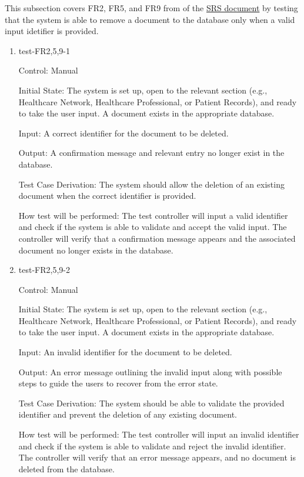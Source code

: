 \documentclass[12pt, titlepage]{article}
\begin{document}
This subsection covers FR2, FR5, and FR9 from of the \href{https://github.com/Inreet-Kaur/capstone/blob/main/docs/SRS/SRS.pdf}{SRS document} by testing that the system is able to remove a document to the database only when a valid input idetifier is provided.

\begin{enumerate}

\item{test-FR2,5,9-1} \label{test-FR2,5,9-1}

Control: Manual

Initial State: The system is set up, open to the relevant section (e.g., Healthcare Network, Healthcare Professional, or Patient Records), and ready to take the user input. A document exists in the appropriate database.

Input: A correct identifier for the document to be deleted.

Output: A confirmation message and relevant entry no longer exist in the database.

Test Case Derivation: The system should allow the deletion of an existing document when the correct identifier is provided. 

How test will be performed: The test controller will input a valid identifier and check if the system is able to validate and accept the valid input. The controller will verify that a confirmation message appears and the associated document no longer exists in the database.

					
\item{test-FR2,5,9-2} \label{test-FR2,5,9-2}

Control: Manual

Initial State: The system is set up, open to the relevant section (e.g., Healthcare Network, Healthcare Professional, or Patient Records), and ready to take the user input. A document exists in the appropriate database.

Input: An invalid identifier for the document to be deleted.

Output: An error message outlining the invalid input along with possible steps to guide the users to recover from the error state.

Test Case Derivation: The system should be able to validate the provided identifier and prevent the deletion of any existing document. 

How test will be performed: The test controller will input an invalid identifier and check if the system is able to validate and reject the invalid identifier. The controller will verify that an error message appears, and no document is deleted from the database.

\end{enumerate}
\end{document}
